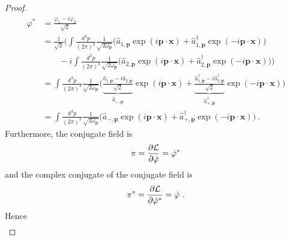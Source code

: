 \begin{proof}
\begin{equation*}
\begin{aligned}
            \varphi^* & = \frac{\varphi_1 - i \varphi_2}{\sqrt{2}} \\ & = \frac{1}{\sqrt{2}} \Big (\int \frac{d^3 p}{{(2\pi)}^3} \frac{1}{\sqrt{2 \omega_{\mathbf p}}} \Big (\hat a_{1, \mathbf p} \exp(i \mathbf p \cdot \mathbf x) + \hat a_{1, \mathbf p}^\dagger \exp(- i \mathbf p \cdot \mathbf x) \Big) \\ & \qquad - i \int \frac{d^3 p}{{(2\pi)}^3} \frac{1}{\sqrt{2 \omega_{\mathbf p}}} \Big (\hat a_{2, \mathbf p} \exp(i \mathbf p \cdot \mathbf x) + \hat a_{2, \mathbf p}^\dagger \exp(- i \mathbf p \cdot \mathbf x) \Big) \Big) \\ & = \int \frac{d^3 p}{{(2\pi)}^3} \frac{1}{\sqrt{2 \omega_{\mathbf p}}} \Big ( \underbrace{\frac{\hat a_{1, \mathbf p} - i \hat a_{2, \mathbf p}}{\sqrt{2}}}_{\hat a_{-, \mathbf p}} \exp(i \mathbf p \cdot \mathbf x) + \underbrace{\frac{\hat a_{1, \mathbf p}^\dagger - i \hat a_{2, \mathbf p}^\dagger}{\sqrt{2}}}_{\hat a_{+, \mathbf p}^\dagger} \exp(- i \mathbf p \cdot \mathbf x) \Big) \\ & = \int \frac{d^3 p}{{(2\pi)}^3} \frac{1}{\sqrt{2 \omega_{\mathbf p}}} \Big ( \hat a_{-, \mathbf p} \exp(i \mathbf p \cdot \mathbf x) + \hat a_{+, \mathbf p}^\dagger \exp(- i \mathbf p \cdot \mathbf x) \Big)  ~.
        \end{aligned}
        \end{equation*}
        Furthermore, the conjugate field is 
        \begin{equation*}
            \pi = \frac{\partial\mathcal L}{\partial\dot \varphi} = \dot \varphi^*
        \end{equation*}
        and the complex conjugate of the conjugate field is 
        \begin{equation*}
            \pi^* = \frac{\partial\mathcal L}{\partial\dot \varphi^*} = \dot \varphi ~.
        \end{equation*}
        Hence 
        \begin{equation*}
        \begin{aligned}

\end{aligned}
\end{equation*}
\end{proof}
